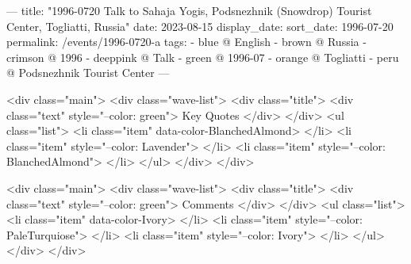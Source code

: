 ---
title: "1996-0720 Talk to Sahaja Yogis, Podsnezhnik (Snowdrop) Tourist Center, Togliatti, Russia"
date: 2023-08-15
display_date: 
sort_date: 1996-07-20
permalink: /events/1996-0720-a
tags:
  - blue @ English
  - brown @ Russia
  - crimson @ 1996
  - deeppink @ Talk
  - green @ 1996-07
  - orange @ Togliatti
  - peru @ Podsnezhnik Tourist Center
---

<div class="main">
  <div class="wave-list">
    <div class="title">
      <div class="text" style="--color: green">
        Key Quotes
      </div>
    </div>
    <ul class="list">
        <li class="item" data-color-BlanchedAlmond>
        </li>
        <li class="item" style="--color: Lavender">
        </li>
        <li class="item" style="--color: BlanchedAlmond">
        </li>
      </ul>
  </div>
</div>

<div class="main">
  <div class="wave-list">
    <div class="title">
      <div class="text" style="--color: green">
        Comments
      </div>
    </div>
    <ul class="list">
        <li class="item" data-color-Ivory>
        </li>
        <li class="item" style="--color: PaleTurquiose">
        </li>
        <li class="item" style="--color: Ivory">
        </li>
      </ul>
  </div>
</div>